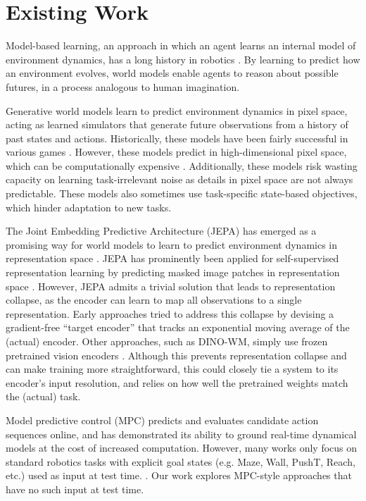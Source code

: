 \documentclass[10pt, twocolumn]{article}
\theoremstyle{definition}
\theoremstyle{remark}
\begin{document}
\section{Existing Work}

Model-based learning, an approach in which
an agent learns an internal model of environment dynamics,
has a long history in robotics \citep{sutton1991dyna, holkar2011mpc, williams2017mppi}.
By learning to predict how an environment evolves,
world models enable agents to reason about possible futures, in a process analogous to human imagination.

Generative world models learn to predict environment dynamics in pixel space, acting as learned simulators that generate future observations from a history of past states and actions.
Historically, these models have been fairly successful in various games \citep{hafner2025dreamerv4, micheli2023iris, decart2024oasis, alonso2024diamond}.
However, these models predict in high-dimensional pixel space, which can be computationally expensive \citep{ko2023actionless}.
Additionally, these models risk wasting capacity on learning task-irrelevant noise as details in pixel space are not always predictable.
These models also sometimes use task-specific state-based objectives, which hinder adaptation to new tasks.

The Joint Embedding Predictive Architecture (JEPA) has emerged as a promising way for world models to learn to predict environment dynamics in representation space \citep{lecun2022autonomous}.
JEPA has prominently been applied
for self-supervised representation learning
by predicting masked image patches in representation space \citep{assran2023ijepa, bardes2024vjepa, assran2025vjepa2}.
However, JEPA admits a trivial solution
that leads to representation collapse,
as the encoder can learn to map all observations
to a single representation.
Early approaches tried to address this collapse
by devising a gradient-free ``target encoder''
that tracks an exponential moving average
of the (actual) encoder.
Other approaches, such as DINO-WM,
simply use frozen pretrained vision encoders \citep{zhou2025dinowm}.
Although this prevents representation collapse
and can make training more straightforward,
this could closely tie a system to its encoder's input resolution,
and relies on how well the pretrained weights match the (actual) task.

Model predictive control (MPC) predicts and evaluates candidate action sequences online, and has demonstrated its ability to ground real-time dynamical models at the cost of increased computation.
However, many works only focus on standard robotics tasks
with explicit goal states (e.g. Maze, Wall, PushT, Reach, etc.) used as input at test time. \citep{fu2021d4rl, tassa2018dmcontrol}.
Our work explores MPC-style approaches that have no such input at test time.
\end{document}
